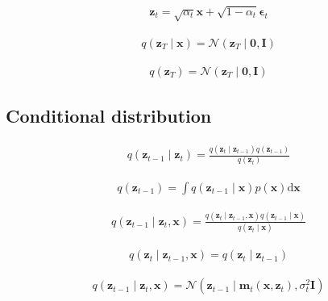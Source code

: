 \documentclass{article}
\begin{document}
\begin{align*}
\mathbf{z}_{t}=\sqrt{\alpha_{t}} \mathbf{x}+\sqrt{1-\alpha_{t}} \boldsymbol{\epsilon}_{t}
\tag{20.8}
\end{align*}

\begin{align*}
q\left(\mathbf{z}_{T} \mid \mathbf{x}\right)=\mathcal{N}\left(\mathbf{z}_{T} \mid \mathbf{0}, \mathbf{I}\right)
\tag{20.9}
\end{align*}

\begin{align*}
q\left(\mathbf{z}_{T}\right)=\mathcal{N}\left(\mathbf{z}_{T} \mid \mathbf{0}, \mathbf{I}\right)
\tag{20.10}
\end{align*}

\subsection{Conditional distribution}

\begin{align*}
q\left(\mathbf{z}_{t-1} \mid \mathbf{z}_{t}\right)=\frac{q\left(\mathbf{z}_{t} \mid \mathbf{z}_{t-1}\right) q\left(\mathbf{z}_{t-1}\right)}{q\left(\mathbf{z}_{t}\right)}
\tag{20.11}
\end{align*}

\begin{align*}
q\left(\mathbf{z}_{t-1}\right)=\int q\left(\mathbf{z}_{t-1} \mid \mathbf{x}\right) p(\mathbf{x}) \mathrm{d} \mathbf{x}
\tag{20.12}
\end{align*}

\begin{align*}
q\left(\mathbf{z}_{t-1} \mid \mathbf{z}_{t}, \mathbf{x}\right)=\frac{q\left(\mathbf{z}_{t} \mid \mathbf{z}_{t-1}, \mathbf{x}\right) q\left(\mathbf{z}_{t-1} \mid \mathbf{x}\right)}{q\left(\mathbf{z}_{t} \mid \mathbf{x}\right)}
\tag{20.13}
\end{align*}

\begin{align*}
q\left(\mathbf{z}_{t} \mid \mathbf{z}_{t-1}, \mathbf{x}\right)=q\left(\mathbf{z}_{t} \mid \mathbf{z}_{t-1}\right)
\tag{20.14}
\end{align*}

\begin{align*}
q\left(\mathbf{z}_{t-1} \mid \mathbf{z}_{t}, \mathbf{x}\right)=\mathcal{N}\left(\mathbf{z}_{t-1} \mid \mathbf{m}_{t}\left(\mathbf{x}, \mathbf{z}_{t}\right), \sigma_{t}^{2} \mathbf{I}\right)
\tag{20.15}
\end{align*}
\end{document}
